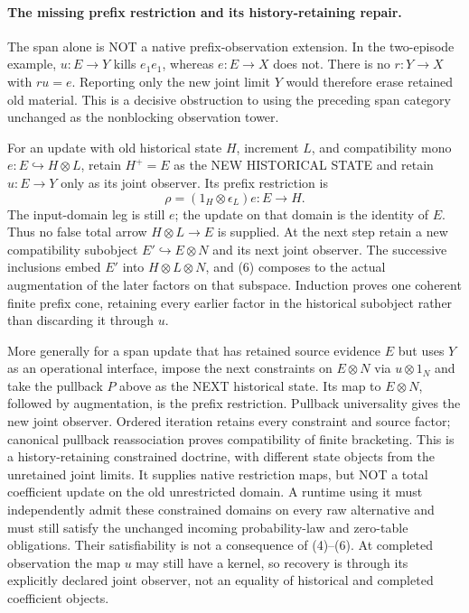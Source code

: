 \documentclass[11pt]{article}
\begin{document}
\paragraph{The missing prefix restriction and its history-retaining repair.}
The span alone is NOT a native prefix-observation extension. In the two-episode example, $u:E\to Y$ kills $e_1e_1$, whereas $e:E\to X$ does not. There is no $r:Y\to X$ with $ru=e$. Reporting only the new joint limit $Y$ would therefore erase retained old material. This is a decisive obstruction to using the preceding span category unchanged as the nonblocking observation tower.

For an update with old historical state $H$, increment $L$, and compatibility mono $e:E\hookrightarrow H\otimes L$, retain $H^+=E$ as the NEW HISTORICAL STATE and retain $u:E\to Y$ only as its joint observer. Its prefix restriction is
\[
 \rho=(1_H\otimes\epsilon_L)e:E\longrightarrow H.\tag{6}
\]
The input-domain leg is still $e$; the update on that domain is the identity of $E$. Thus no false total arrow $H\otimes L\to E$ is supplied. At the next step retain a new compatibility subobject $E'\hookrightarrow E\otimes N$ and its next joint observer. The successive inclusions embed $E'$ into $H\otimes L\otimes N$, and (6) composes to the actual augmentation of the later factors on that subspace. Induction proves one coherent finite prefix cone, retaining every earlier factor in the historical subobject rather than discarding it through $u$.

More generally for a span update that has retained source evidence $E$ but uses $Y$ as an operational interface, impose the next constraints on $E\otimes N$ via $u\otimes1_N$ and take the pullback $P$ above as the NEXT historical state. Its map to $E\otimes N$, followed by augmentation, is the prefix restriction. Pullback universality gives the new joint observer. Ordered iteration retains every constraint and source factor; canonical pullback reassociation proves compatibility of finite bracketing. This is a history-retaining constrained doctrine, with different state objects from the unretained joint limits. It supplies native restriction maps, but NOT a total coefficient update on the old unrestricted domain. A runtime using it must independently admit these constrained domains on every raw alternative and must still satisfy the unchanged incoming probability-law and zero-table obligations. Their satisfiability is not a consequence of (4)--(6). At completed observation the map $u$ may still have a kernel, so recovery is through its explicitly declared joint observer, not an equality of historical and completed coefficient objects.
\end{document}
